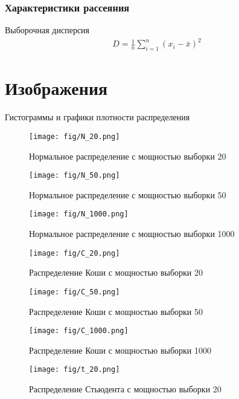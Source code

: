 \subsubsection{Характеристики рассеяния}
Выборочная дисперсия \begin{gather*}
    D = \frac{1}{n}\displaystyle\sum_{i=1}^{n}(x_i - \bar{x})^{2}
\end{gather*}

\section{Изображения}
Гистограммы и графики плотности распределения 

    \begin{figure}
        \centering
        \texttt{[image: fig/N\_20.png]}
        \caption{Нормальное распределение с мощностью выборки 20}
        \label{fig:enter-label}
    \end{figure}

    
    \begin{figure}
        \centering
        \texttt{[image: fig/N\_50.png]}
        \caption{Нормальное распределение с мощностью выборки 50}
        \label{fig:enter-label}
    \end{figure}
 
    \begin{figure}
        \centering
        \texttt{[image: fig/N\_1000.png]}
        \caption{Нормальное распределение с мощностью выборки 1000}
        \label{fig:enter-label}
    \end{figure}
 
    \begin{figure}
        \centering
        \texttt{[image: fig/C\_20.png]}
        \caption{Распределение Коши с мощностью выборки 20}
        \label{fig:enter-label}
    \end{figure}
 
    \begin{figure}
        \centering
        \texttt{[image: fig/C\_50.png]}
        \caption{Распределение Коши с мощностью выборки 50}
        \label{fig:enter-label}
    \end{figure}
 
    \begin{figure}
        \centering
        \texttt{[image: fig/C\_1000.png]}
        \caption{Распределение Коши с мощностью выборки 1000}
        \label{fig:enter-label}
    \end{figure}
 
    \begin{figure}
        \centering
        \texttt{[image: fig/t\_20.png]}
              \caption{Распределение Стьюдента с мощностью выборки 20}
        \label{fig:enter-label}
    \end{figure}
 
